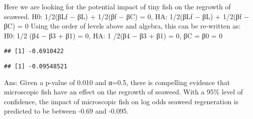 \documentclass[
]{article}
\newenvironment{Shaded}{\begin{snugshade}}{\end{snugshade}}
\newcommand{\AttributeTok}[1]{\textcolor[rgb]{0.77,0.63,0.00}{#1}}
\newcommand{\DecValTok}[1]{\textcolor[rgb]{0.00,0.00,0.81}{#1}}
\newcommand{\FunctionTok}[1]{\textcolor[rgb]{0.00,0.00,0.00}{#1}}
\newcommand{\NormalTok}[1]{#1}
\newcommand{\OtherTok}[1]{\textcolor[rgb]{0.56,0.35,0.01}{#1}}
\newcommand{\SpecialCharTok}[1]{\textcolor[rgb]{0.00,0.00,0.00}{#1}}
\begin{document}
Here we are looking for the potential impact of tiny fish on the
regrowth of seaweed. H0: 1/2(βLf − βL) + 1/2(βf − βC) = 0, HA: 1/2(βLf −
βL) + 1/2(βf − βC) = 0 Using the order of levels above and algebra, this
can be re-written as: H0: 1/2 (β4 − β3 + β1) = 0, HA: 1 /2(β4 − β3 + β1)
= 0, βC = β0 = 0

\begin{Shaded}
\end{Shaded}

\begin{verbatim}
## [1] -0.6910422
\end{verbatim}

\begin{Shaded}
\end{Shaded}

\begin{verbatim}
## [1] -0.09548521
\end{verbatim}

Ans: Given a p-value of 0.010 and α=0.5, there is compelling evidence
that microscopic fish have an effect on the regrowth of seaweed. With a
95\% level of confidence, the impact of microscopic fish on log odds
seaweed regeneration is predicted to be between -0.69 and -0.095.
\end{document}
